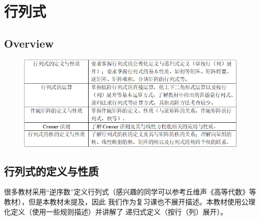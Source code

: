 \chapter{行列式}

\section{Overview}
\begin{figure}[h]
	\centering
	\includegraphics[scale=0.58]{7.png}
\end{figure}

\section{行列式的定义与性质}
很多教材采用“逆序数”定义行列式（感兴趣的同学可以参考丘维声《高等代数》等教材），但是本教材未提及，因此
我们作为复习课也不展开描述。本教材使用公理化定义（使用一些规则描述）并讲解了
递归式定义（按行（列）展开）。

